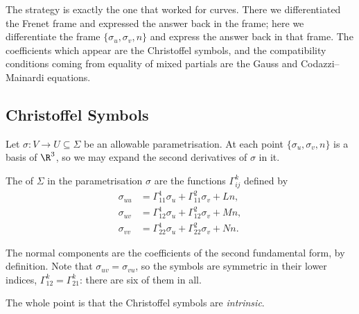 The strategy is exactly the one that worked for curves. There we differentiated the Frenet frame and expressed the answer back in the frame; here we differentiate the frame $\{\sigma_u, \sigma_v, n\}$ and express the answer back in that frame. The coefficients which appear are the Christoffel symbols, and the compatibility conditions coming from equality of mixed partials are the Gauss and Codazzi--Mainardi equations.

\subsection{Christoffel Symbols}

Let $\sigma: V \rightarrow U \subseteq \Sigma$ be an allowable parametrisation. At each point $\{\sigma_u, \sigma_v, n\}$ is a basis of $\R^3$, so we may expand the second derivatives of $\sigma$ in it.

\begin{definition}
    The  of $\Sigma$ in the parametrisation $\sigma$ are the functions $\Gamma^k_{ij}$ defined by
    \begin{align*}
        \sigma_{uu} &= \Gamma^1_{11}\sigma_u + \Gamma^2_{11}\sigma_v + L n, \\
        \sigma_{uv} &= \Gamma^1_{12}\sigma_u + \Gamma^2_{12}\sigma_v + M n, \\
        \sigma_{vv} &= \Gamma^1_{22}\sigma_u + \Gamma^2_{22}\sigma_v + N n.
    \end{align*}
\end{definition}

The normal components are the coefficients of the second fundamental form, by definition. Note that $\sigma_{uv} = \sigma_{vu}$, so the symbols are symmetric in their lower indices, $\Gamma^k_{12} = \Gamma^k_{21}$: there are six of them in all.

The whole point is that the Christoffel symbols are \emph{intrinsic}.

